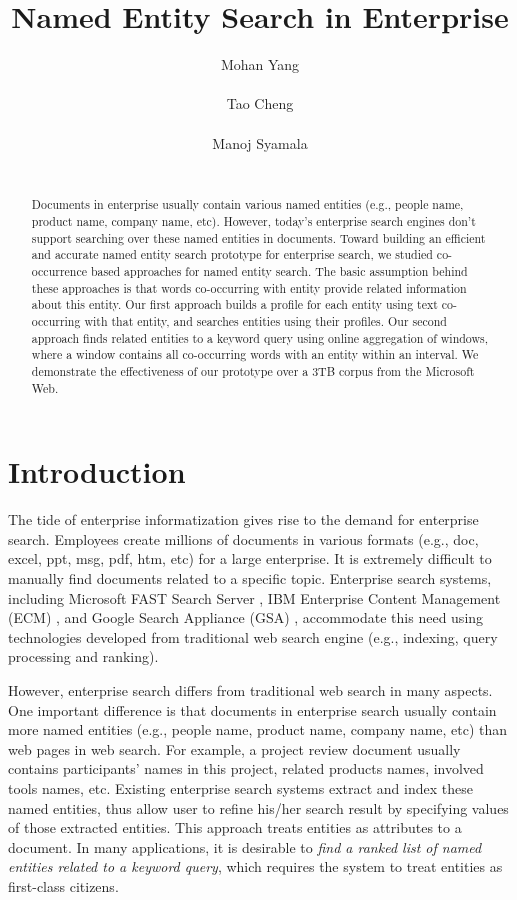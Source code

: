\documentclass{sig-alternate}
\title{Named Entity Search in Enterprise}
\author{
\alignauthor
Mohan Yang\\ 
\affaddr{UCLA CS Department}\\
\email{yang@cs.ucla.edu}
\alignauthor
Tao Cheng\\
\affaddr{Microsoft Research}\\
\email{taocheng@microsoft.com}
\alignauthor
Manoj Syamala\\
\affaddr{Microsoft Research}\\
\email{manojsy@microsoft.com}
}
\theoremstyle{definition}
\begin{document}
\maketitle

\begin{abstract}
Documents in enterprise usually contain various named entities (e.g., people name, product name, company name, etc). However, today's enterprise search engines don't support searching over these named entities in documents. Toward building an efficient and accurate named entity search prototype for enterprise search, we studied co-occurrence based approaches for named entity search. The basic assumption behind these approaches is that words co-occurring with entity provide related information about this entity. Our first approach builds a profile for each entity using text co-occurring with that entity, and searches entities using their profiles. Our second approach finds related entities to a keyword query using online aggregation of windows, where a window contains all co-occurring words with an entity within an interval. We demonstrate the effectiveness of our prototype over a 3TB corpus from the Microsoft Web.
\end{abstract}

\section{Introduction}
The tide of enterprise informatization gives rise to the demand for enterprise search. Employees create millions of documents in various formats (e.g., doc, excel, ppt, msg, pdf, htm, etc) for a large enterprise. It is extremely difficult to manually find documents related to a specific topic. Enterprise search systems, including Microsoft FAST Search Server \cite{fast2010}, IBM Enterprise Content Management (ECM) \cite{ibmecm}, and Google Search Appliance (GSA) \cite{gsa7}, accommodate this need using technologies developed from traditional web search engine (e.g., indexing, query processing and ranking).

However, enterprise search differs from traditional web search in many aspects. One important difference is that documents in enterprise search usually contain more named entities (e.g., people name, product name, company name, etc) than web pages in web search. For example, a project review document usually contains participants' names in this project, related products names, involved tools names, etc. Existing enterprise search systems extract and index these named entities, thus allow user to refine his/her search result by specifying values of those extracted entities. This approach treats entities as attributes to a document. In many applications, it is desirable to {\em find a ranked list of named entities related to a keyword query}, which requires the system to treat entities as first-class citizens.
\end{document}
